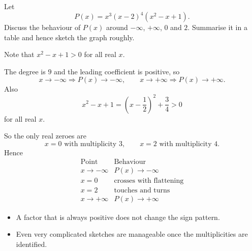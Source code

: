 
\begin{problem}
Let
\[
P(x)=x^3(x-2)^4(x^2-x+1).
\]
Discuss the behaviour of $P(x)$ around $-\infty$, $+\infty$, $0$ and $2$. Summarise it in a table and hence sketch the graph roughly.
\end{problem}

\begin{hintbox}
Note that $x^2-x+1>0$ for all real $x$.
\end{hintbox}

\begin{solution}
The degree is $9$ and the leading coefficient is positive, so
\[
x\to-\infty \Rightarrow P(x)\to-\infty,\qquad
x\to+\infty \Rightarrow P(x)\to+\infty.
\]
Also
\[
x^2-x+1=\left(x-\frac12\right)^2+\frac34>0
\]
for all real $x$.

So the only real zeroes are
\[
x=0 \text{ with multiplicity }3,\qquad x=2 \text{ with multiplicity }4.
\]
Hence
\[
\begin{array}{c|c}
\text{Point} & \text{Behaviour}\\ \hline
x\to-\infty & P(x)\to-\infty\\
x=0 & \text{crosses with flattening}\\
x=2 & \text{touches and turns}\\
x\to+\infty & P(x)\to+\infty
\end{array}
\]

\begin{center}
\end{center}
\end{solution}

\begin{takeaways}
\begin{itemize}[leftmargin=*]
\item A factor that is always positive does not change the sign pattern.
\item Even very complicated sketches are manageable once the multiplicities are identified.
\end{itemize}
\end{takeaways}

